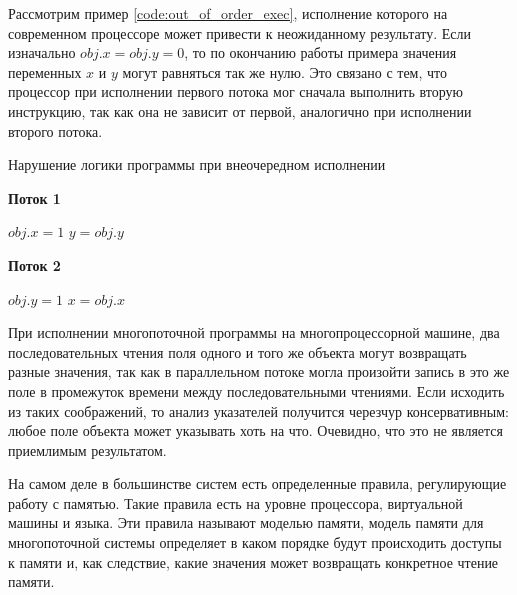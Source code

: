 \documentclass[14pt,titlepage]{extarticle}
\newcommand{\algorithmictitle}[1]{\hspace{8mm}\textbf{#1}}
\begin{document}
      Рассмотрим пример \ref{code:out_of_order_exec}, исполнение которого на
      современном процессоре может привести к неожиданному результату.
      Если изначально $obj.x = obj.y = 0$, то по окончанию работы примера
      значения переменных $x$ и $y$ могут равняться так же нулю. Это связано с
      тем, что процессор при исполнении первого потока мог сначала выполнить
      вторую инструкцию, так как она не зависит от первой, аналогично при
      исполнении второго потока.

      \begin{algorithm}
        \caption{Нарушение логики программы при внеочередном исполнении}
        \label{code:out_of_order_exec}
        \begin{multicols*}{2}
          \algorithmictitle{Поток 1}
          \begin{algorithmic}[1]
            \STATE $obj.x = 1$
            \STATE $y = obj.y$
          \end{algorithmic}
          \columnbreak
          \algorithmictitle{Поток 2}
          \begin{algorithmic}[1]
            \STATE $obj.y = 1$
            \STATE $x = obj.x$
          \end{algorithmic}
        \end{multicols*}
      \end{algorithm}


      При исполнении многопоточной программы на многопроцессорной машине,
      два последовательных чтения поля одного и того же объекта могут
      возвращать разные значения, так как в параллельном потоке могла произойти
      запись в это же поле в промежуток времени между последовательными
      чтениями. Если исходить из таких соображений, то анализ указателей
      получится черезчур консервативным: любое поле объекта может указывать
      хоть на что. Очевидно, что это не является приемлимым результатом.

      На самом деле в большинстве систем есть определенные правила,
      регулирующие работу с памятью. Такие правила есть на уровне процессора,
      виртуальной машины и языка. Эти правила называют моделью памяти,
      модель памяти для многопоточной системы определяет в каком
      порядке будут происходить доступы к памяти и, как следствие, какие
      значения может возвращать конкретное чтение памяти.


  \newpage
\end{document}
